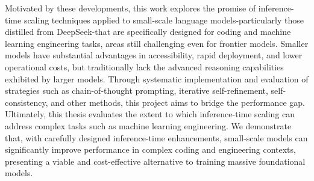 Motivated by these developments, this work explores the promise of inference-time scaling techniques applied to small-scale language models-particularly those distilled from DeepSeek-that are specifically designed for coding and machine learning engineering tasks, areas still challenging even for frontier models. Smaller models have substantial advantages in accessibility, rapid deployment, and lower operational costs, but traditionally lack the advanced reasoning capabilities exhibited by larger models. Through systematic implementation and evaluation of strategies such as chain-of-thought prompting, iterative self-refinement, self-consistency, and other methods, this project aims to bridge the performance gap. Ultimately, this thesis evaluates the extent to which inference-time scaling can address complex tasks such as machine learning engineering. We demonstrate that, with carefully designed inference-time enhancements, small-scale models can significantly improve performance in complex coding and engineering contexts, presenting a viable and cost-effective alternative to training massive foundational models.

